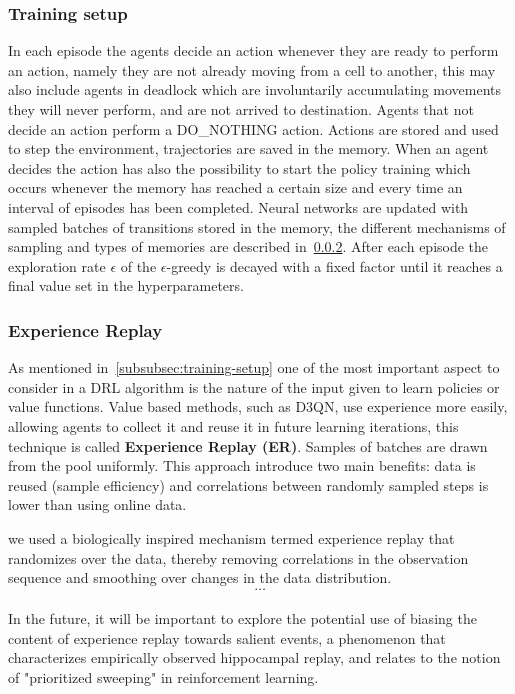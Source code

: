 \documentclass[11pt, a4paper, hidelinks]{report}
\begin{document}
\subsubsection{Training setup}

In each episode the agents decide an action whenever they are ready to perform an action, namely they are not already moving from a cell to another, this may also include agents in deadlock which are involuntarily accumulating movements they will never perform, and are not arrived to destination.
Agents that not decide an action perform a DO\_NOTHING action.
Actions are stored and used to step the environment, trajectories are saved in the memory.
When an agent decides the action has also the possibility to start the policy training which occurs whenever the memory has reached a certain size and every time an interval of episodes has been completed.
Neural networks are updated with sampled batches of transitions stored in the memory, the different mechanisms of sampling and types of memories are described in~\ref{subsubsec:experience-replay}.
After each episode the exploration rate $\epsilon$ of the $\epsilon$-greedy is decayed with a fixed factor until it reaches a final value set in the hyperparameters.

\subsubsection{Experience Replay}\label{subsubsec:experience-replay}

As mentioned in~\ref{subsubsec:training-setup} one of the most important aspect to consider in a DRL algorithm is the nature of the input given to learn policies or value functions.
Value based methods, such as D3QN, use experience more easily, allowing agents to collect it and reuse it in future learning iterations, this technique is called \textbf{Experience Replay (ER)}.
Samples of batches are drawn from the pool uniformly.
This approach introduce two main benefits: data is reused (sample efficiency) and correlations between randomly sampled steps is lower than using online data.

\begin{quoting}[font=itshape, begintext={"}, endtext={"\citep{human-level}}]
we used a biologically inspired mechanism termed experience replay that randomizes over the data, thereby removing correlations in the observation sequence and smoothing over changes in the data distribution.\\
\[\dots\]\\
In the future, it will be important to explore the potential use of biasing the content of experience replay towards salient events, a phenomenon that characterizes empirically observed hippocampal replay, and relates to the notion of "prioritized sweeping" in reinforcement learning.
\end{quoting}
\end{document}

